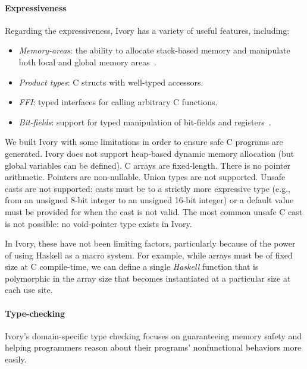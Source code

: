 \paragraph{Expressiveness}
Regarding the expressiveness, Ivory has a variety of useful features, including:
\begin{itemize}
  \item \emph{Memory-areas}: the ability to allocate stack-based memory and
    manipulate both local and global memory areas~\cite{memareas}.
  \item \emph{Product types}: C structs with well-typed accessors.
  \item \emph{FFI}: typed interfaces for calling arbitrary C functions.
  \item \emph{Bit-fields}: support for typed manipulation of bit-fields and
    registers~\cite{high-level}.
\end{itemize}

We built Ivory with some limitations in order to  ensure safe C programs are
generated.  Ivory does not support heap-based dynamic memory allocation (but
global variables can be defined).  C arrays are fixed-length.  There is no
pointer arithmetic.  Pointers are non-nullable.  Union types are not supported.
Unsafe casts are not supported: casts must be to a strictly more expressive type
(e.g., from an unsigned 8-bit integer to an unsigned 16-bit integer) or a
default value must be provided for when the cast is not valid. The most common
unsafe C cast is not possible: no void-pointer type exists in Ivory.

In Ivory, these have not been limiting factors, particularly because of the
power of using Haskell as a macro system.  For example, while arrays must be of
fixed size at C compile-time, we can define a single \emph{Haskell} function
that is polymorphic in the array size that becomes instantiated at a particular
size at each use site.  %


\paragraph{Type-checking}
Ivory's domain-specific type checking focuses on guaranteeing memory
safety and helping programmers reason about their programs' nonfunctional
behaviors more easily.

